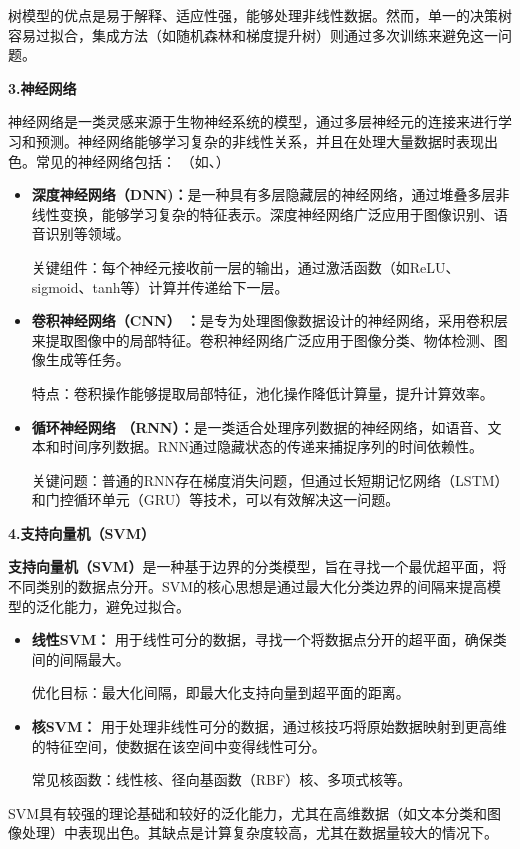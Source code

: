 树模型的优点是易于解释、适应性强，能够处理非线性数据。然而，单一的决策树容易过拟合，集成方法（如随机森林和梯度提升树）则通过多次训练来避免这一问题。

{\bf 3.神经网络}

神经网络是一类灵感来源于生物神经系统的模型，通过多层神经元的连接来进行学习和预测。神经网络能够学习复杂的非线性关系，并且在处理大量数据时表现出色。常见的神经网络包括： （如、）
\begin{itemize}
\item {\bf 深度神经网络（DNN)：}是一种具有多层隐藏层的神经网络，通过堆叠多层非线性变换，能够学习复杂的特征表示。深度神经网络广泛应用于图像识别、语音识别等领域。

关键组件：每个神经元接收前一层的输出，通过激活函数（如ReLU、sigmoid、tanh等）计算并传递给下一层。  

\item  {\bf 卷积神经网络（CNN） ：}是专为处理图像数据设计的神经网络，采用卷积层来提取图像中的局部特征。卷积神经网络广泛应用于图像分类、物体检测、图像生成等任务。

特点：卷积操作能够提取局部特征，池化操作降低计算量，提升计算效率。

\item  {\bf 循环神经网络  （RNN）：}是一类适合处理序列数据的神经网络，如语音、文本和时间序列数据。RNN通过隐藏状态的传递来捕捉序列的时间依赖性。

关键问题：普通的RNN存在梯度消失问题，但通过长短期记忆网络（LSTM）和门控循环单元（GRU）等技术，可以有效解决这一问题。

\end{itemize}

{\bf 4.支持向量机（SVM）    }

{\bf 支持向量机（SVM）}是一种基于边界的分类模型，旨在寻找一个最优超平面，将不同类别的数据点分开。SVM的核心思想是通过最大化分类边界的间隔来提高模型的泛化能力，避免过拟合。

\begin{itemize}
\item {\bf  线性SVM：  } 用于线性可分的数据，寻找一个将数据点分开的超平面，确保类间的间隔最大。

优化目标：最大化间隔，即最大化支持向量到超平面的距离。
\item  {\bf  核SVM：  } 用于处理非线性可分的数据，通过核技巧将原始数据映射到更高维的特征空间，使数据在该空间中变得线性可分。

常见核函数：线性核、径向基函数（RBF）核、多项式核等。

\end{itemize}
SVM具有较强的理论基础和较好的泛化能力，尤其在高维数据（如文本分类和图像处理）中表现出色。其缺点是计算复杂度较高，尤其在数据量较大的情况下。

